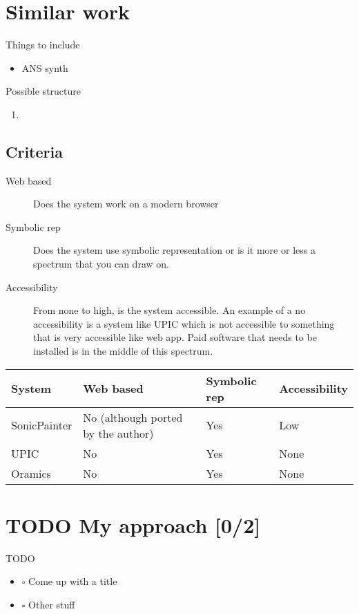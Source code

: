 \documentclass[a4paper,12pt]{article}
\begin{document}
\section{Similar work}
\label{sec:orgd34952f}


Things to include
\begin{itemize}
\item ANS synth
\end{itemize}


Possible structure
\begin{enumerate}
\item 
\end{enumerate}

\subsection{Criteria}
\label{sec:org4db3010}
\begin{description}
\item[{Web based}] Does the system work on a modern browser
\item[{Symbolic rep}] Does the system use symbolic representation or is it more or
less a spectrum that you can draw on.
\item[{Accessibility}] From none to high, is the system accessible. An example of a
no accessibility is a system like UPIC which is not
accessible to something that is very accessible like web
app. Paid software that needs to be installed is in the
middle of this spectrum.
\end{description}

\begin{center}
\begin{tabular}{llll}
System & Web based & Symbolic rep & Accessibility\\
\hline
SonicPainter & No (although ported by the author) & Yes & Low\\
UPIC & No & Yes & None\\
Oramics & No & Yes & None\\
\end{tabular}
\end{center}

\section{{\bfseries\sffamily TODO} My approach [0/2]}
\label{sec:org199542a}
TODO
\begin{itemize}
\item $\square$ Come up with a title
\item $\square$ Other stuff
\end{itemize}
\end{document}
